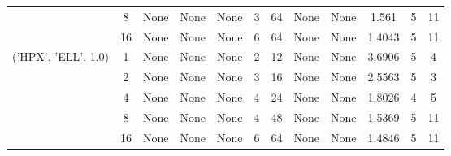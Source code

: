 \begin{tabular}{cccccccccccc}
& 8& None& None& None& 3& 64& None& None& 1.561& 5& 11\\
& 16& None& None& None& 6& 64& None& None& 1.4043& 5& 11\\
\hline
\multirow{5}{*}{('HPX', 'ELL', 1.0)}& 1& None& None& None& 2& 12& None& None& 3.6906& 5& 4\\
& 2& None& None& None& 3& 16& None& None& 2.5563& 5& 3\\
& 4& None& None& None& 4& 24& None& None& 1.8026& 4& 5\\
& 8& None& None& None& 4& 48& None& None& 1.5369& 5& 11\\
& 16& None& None& None& 6& 64& None& None& 1.4846& 5& 11\\
\hline
\end{tabular}
